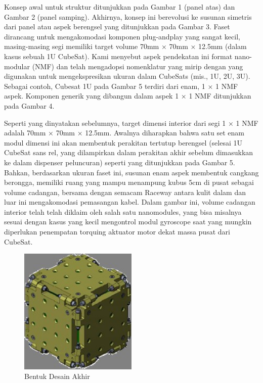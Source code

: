 Konsep awal untuk struktur ditunjukkan pada Gambar 1 (panel atas) dan Gambar 2 (panel samping). Akhirnya, konsep ini berevolusi ke susunan simetris dari panel atau aspek berengsel yang ditunjukkan pada Gambar 3. Faset dirancang untuk mengakomodasi komponen plug-andplay yang sangat kecil, masing-masing segi memiliki target volume 70mm × 70mm × 12.5mm (dalam kasus sebuah 1U CubeSat). Kami menyebut aspek pendekatan ini format nano-modular (NMF) dan telah mengadopsi nomenklatur yang mirip dengan yang digunakan untuk mengekspresikan ukuran dalam CubeSats (mis., 1U, 2U, 3U). Sebagai contoh, Cubesat 1U pada Gambar 5 terdiri dari enam, 1 × 1 NMF aspek. Komponen generik yang dibangun dalam aspek 1 × 1 NMF ditunjukkan pada Gambar 4.

Seperti yang dinyatakan sebelumnya, target dimensi interior dari segi 1 × 1 NMF adalah 70mm × 70mm × 12.5mm. Awalnya diharapkan bahwa satu set enam modul dimensi ini akan membentuk perakitan tertutup berengsel (selesai 1U CubeSat sans rel, yang dilampirkan dalam perakitan akhir sebelum dimasukkan ke dalam dispenser peluncuran) seperti yang ditunjukkan pada Gambar 5. Bahkan, berdasarkan ukuran faset ini, susunan enam aspek membentuk cangkang berongga, memiliki ruang yang mampu menampung kubus 5cm di pusat sebagai volume cadangan, bersama dengan semacam Raceway antara kulit dalam dan luar ini mengakomodasi pemasangan kabel. Dalam gambar ini, volume cadangan interior telah telah diklaim oleh salah satu nanomodules, yang bisa misalnya sesuai dengan kasus yang kecil mengontrol modul gyroscope saat yang mungkin diperlukan penempatan torquing aktuator motor dekat massa pusat dari CubeSat.

  \begin{figure}[ht]
\centerline{\includegraphics[width=0.5\textwidth]{figures/Thefinaldesign.jpg}}
  \caption{Bentuk Desain Akhir}
  \label{Thefinaldesign}
  \end{figure}

